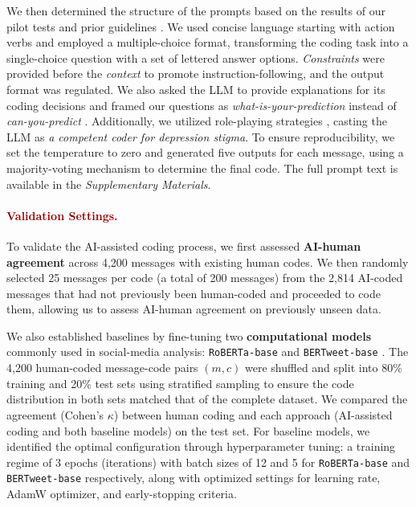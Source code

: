 We then determined the structure of the prompts based on the results of our pilot tests and prior guidelines \cite{prompt_guidance_ziems_2024, chatbot_various_task_amin_2023, label_llm_kuzman_2023, label_llm_zhu_2023}. 
We used concise language starting with action verbs and employed a multiple-choice format, transforming the coding task into a single-choice question with a set of lettered answer options. 
\textit{Constraints} were provided before the \textit{context} to promote instruction-following, and the output format was regulated. 
We also asked the LLM to provide explanations for its coding decisions and framed our questions as \textit{what-is-your-prediction} instead of \textit{can-you-predict} \cite{chatbot_various_task_amin_2023}. 
Additionally, we utilized role-playing strategies \cite{prompt_practice_reiss_2023}, casting the LLM as \textit{a competent coder for depression stigma}. 
To ensure reproducibility, we set the temperature to zero and generated five outputs for each message, using a majority-voting mechanism to determine the final code. 
The full prompt text is available in the \textit{Supplementary Materials}.



\paragraph{\textcolor{darkred}{\textbf{Validation Settings.}}}
To validate the AI-assisted coding process, we first assessed \textbf{AI-human agreement} across 4,200 messages with existing human codes. 
We then randomly selected 25 messages per code (a total of 200 messages) from the 2,814 AI-coded messages that had not previously been human-coded and proceeded to code them, allowing us to assess AI-human agreement on previously unseen data.


We also established baselines by fine-tuning two \textbf{computational models} commonly used in social-media analysis: \texttt{RoBERTa-base} \cite{roberta_liu_2019} and \texttt{BERTweet-base} \cite{bertweet_nguyen_2020}. 
The 4,200 human-coded message-code pairs $(m, c)$ were shuffled and split into 80\% training and 20\% test sets using stratified sampling to ensure the code distribution in both sets matched that of the complete dataset. 
We compared the agreement (Cohen's $\kappa$) between human coding and each approach (AI-assisted coding and both baseline models) on the test set.
For baseline models, we identified the optimal configuration through hyperparameter tuning: a training regime of 3 epochs (iterations) with batch sizes of 12 and 5 for \texttt{RoBERTa-base} and \texttt{BERTweet-base} respectively, along with optimized settings for learning rate, AdamW optimizer, and early-stopping criteria.




